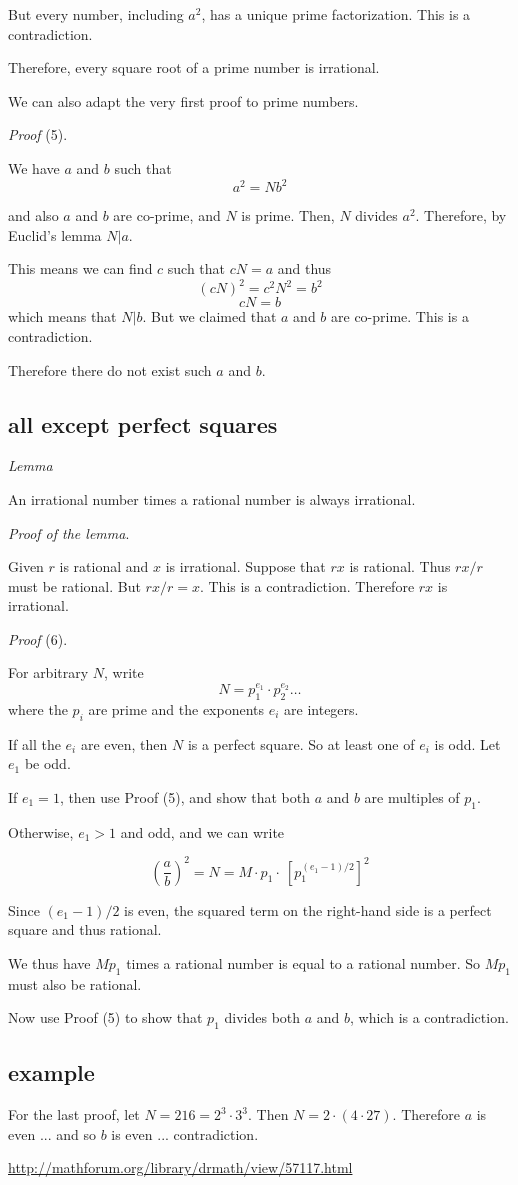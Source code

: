 \documentclass[11pt, oneside]{article}
\begin{document}
But every number, including $a^2$, has a unique prime factorization.  This is a contradiction.

Therefore, every square root of a prime number is irrational.

We can also adapt the very first proof to prime numbers.  

\emph{Proof} (5).

We have $a$ and $b$ such that
\[ a^2 = N b^2 \]

and also $a$ and $b$ are co-prime, and $N$ is prime.  Then, $N$ divides $a^2$.  Therefore, by Euclid's lemma $N|a$.  

This means we can find $c$ such that $cN = a$ and thus
\[ (cN)^2 = c^2N^2 = b^2 \]
\[ cN = b \]
which means that $N|b$.  But we claimed that $a$ and $b$ are co-prime.  This is a contradiction.

Therefore there do not exist such $a$ and $b$.

\subsection*{all except perfect squares}

\emph{Lemma}

An irrational number times a rational number is always irrational.

\emph{Proof of the lemma}.

Given $r$ is rational and $x$ is irrational.  Suppose that $rx$ is rational.  Thus $rx/r$ must be rational.  But $rx/r = x$.  This is a contradiction.  Therefore $rx$ is irrational.

\emph{Proof} (6).

For arbitrary $N$, write 
\[ N = p_1^{e_1} \cdot p_2^{e_2} \dots \]
where the $p_i$ are prime and the exponents $e_i$ are integers.

If all the $e_i$ are even, then $N$ is a perfect square.  So at least one of $e_i$ is odd.  Let $e_1$ be odd.

If $e_1 = 1$, then use Proof (5), and show that both $a$ and $b$ are multiples of $p_1$.

Otherwise, $e_1 > 1$ and odd, and we can write

\[ (\frac{a}{b})^2 = N = M \cdot p_1 \cdot \ [ p_1^{{(e_1 -1)}/2}]^2 \]

Since $(e_1 - 1)/2$ is even, the squared term on the right-hand side is a perfect square and thus rational.  

We thus have $M p_1$ times a rational number is equal to a rational number.  So $M p_1 $ must also be rational.

Now use Proof (5) to show that $p_1$ divides both $a$ and $b$, which is a contradiction.

\subsection*{example}

For the last proof, let $N = 216 = 2^3 \cdot 3^3$.  Then $N = 2 \cdot (4 \cdot 27)$.  Therefore $a$ is even ... and so $b$ is even ... contradiction.

\url{http://mathforum.org/library/drmath/view/57117.html}
\end{document}
